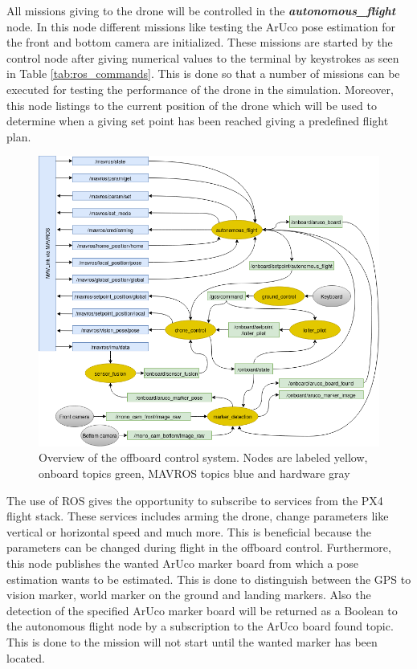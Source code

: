 \documentclass[../Head/report.tex]{subfiles}
\begin{document}
All missions giving to the drone will be controlled in the \textit{\textbf{autonomous\_flight}} node. In this node different missions like testing the ArUco pose estimation for the front and bottom camera are initialized. These missions are started by the control node after giving numerical values to the terminal by keystrokes as seen in Table  \ref{tab:ros_commands}. This is done so that a number of missions can be executed for testing the performance of the drone in the simulation. Moreover, this node listings to the current position of the drone which will be used to determine when a giving set point has been reached giving a predefined flight plan. 

\begin{figure}[H]
    \centering
    \includegraphics[width=0.95\linewidth]{../Figures/node_communication.png}
    \caption{Overview of the offboard control system. Nodes are labeled yellow, onboard topics green, MAVROS topics blue and hardware gray}
    \label{fig:offboard_control}
\end{figure}

The use of ROS gives the opportunity to subscribe to services from the PX4 flight stack. These services includes arming the drone, change parameters like vertical or horizontal speed and much more. This is beneficial because the parameters can be changed during flight in the offboard control. Furthermore, this node publishes the wanted ArUco marker board from which a pose estimation wants to be estimated. This is done to distinguish between the GPS to vision marker, world marker on the ground and landing markers. Also the detection of the specified ArUco marker board will be returned as a Boolean to the autonomous flight node by a subscription to the ArUco board found topic. This is done to the mission will not start until the wanted marker has been located.  
\end{document}
